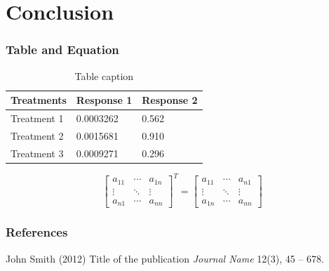 \documentclass[10pt,aspectratio=32]{beamer}
\begin{document}
\section{Conclusion}

\begin{frame}
\frametitle{Table and Equation}
\vspace{-0.3cm}
	\begin{table}
		\begin{tabular}{l l l}
			\toprule
			\textbf{Treatments} & \textbf{Response 1} & \textbf{Response 2}\\
			\midrule
			Treatment 1 & 0.0003262 & 0.562 \\
			Treatment 2 & 0.0015681 & 0.910 \\
			Treatment 3 & 0.0009271 & 0.296 \\
			\bottomrule
		\end{tabular}
		\caption{Table caption}
	\end{table}

\begin{equation} %
\label{eq:matrix_transpose}
\left[
\begin{array}{ccc}
a_{11} & \cdots & a_{1n} \\
\vdots & \ddots & \vdots \\
a_{n1} & \cdots & a_{nn}
\end{array}
\right]^T
= 
\left[
\begin{array}{ccc}
a_{11} & \cdots & a_{n1} \\
\vdots & \ddots & \vdots \\
a_{1n} & \cdots & a_{nn}
\end{array}
\right]
\end{equation}
\end{frame}


\begin{frame}
	\frametitle{References}
	\footnotesize{
		\begin{thebibliography}{99} %
			 John Smith (2012)
			\newblock Title of the publication
			\newblock \emph{Journal Name} 12(3), 45 -- 678.
		\end{thebibliography}
	}
\end{frame}


\begin{frame}
 	\titlepage
\end{frame}
\end{document}
